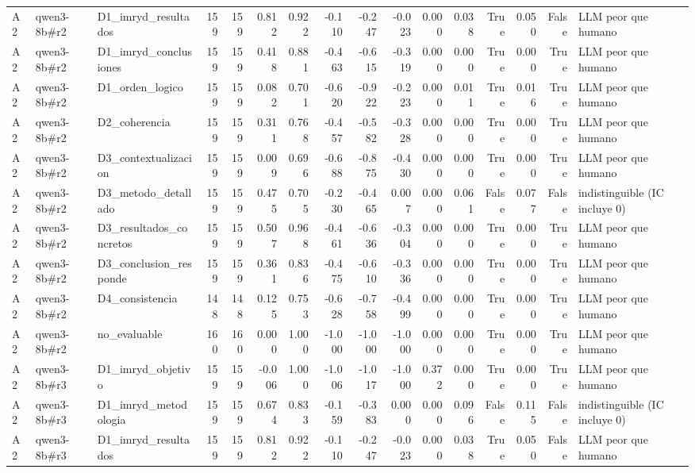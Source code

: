 \begin{table}
{\begin{tabular}{lllrrrrrrrrrrrrl}
A2 & qwen3-8b\#r2 & D1\_imryd\_resultados & 159 & 159 & 0.812 & 0.922 & -0.110 & -0.247 & -0.023 & 0.000 & 0.038 & True & 0.050 & False & LLM peor que humano \\
A2 & qwen3-8b\#r2 & D1\_imryd\_conclusiones & 159 & 159 & 0.418 & 0.881 & -0.463 & -0.615 & -0.319 & 0.000 & 0.000 & True & 0.000 & True & LLM peor que humano \\
A2 & qwen3-8b\#r2 & D1\_orden\_logico & 159 & 159 & 0.082 & 0.701 & -0.620 & -0.922 & -0.223 & 0.000 & 0.011 & True & 0.016 & True & LLM peor que humano \\
A2 & qwen3-8b\#r2 & D2\_coherencia & 159 & 159 & 0.311 & 0.768 & -0.457 & -0.582 & -0.328 & 0.000 & 0.000 & True & 0.000 & True & LLM peor que humano \\
A2 & qwen3-8b\#r2 & D3\_contextualizacion & 159 & 159 & 0.009 & 0.696 & -0.688 & -0.875 & -0.430 & 0.000 & 0.000 & True & 0.000 & True & LLM peor que humano \\
A2 & qwen3-8b\#r2 & D3\_metodo\_detallado & 159 & 159 & 0.475 & 0.705 & -0.230 & -0.465 & 0.007 & 0.000 & 0.061 & False & 0.077 & False & indistinguible (IC incluye 0) \\
A2 & qwen3-8b\#r2 & D3\_resultados\_concretos & 159 & 159 & 0.507 & 0.968 & -0.461 & -0.636 & -0.304 & 0.000 & 0.000 & True & 0.000 & True & LLM peor que humano \\
A2 & qwen3-8b\#r2 & D3\_conclusion\_responde & 159 & 159 & 0.361 & 0.836 & -0.475 & -0.610 & -0.336 & 0.000 & 0.000 & True & 0.000 & True & LLM peor que humano \\
A2 & qwen3-8b\#r2 & D4\_consistencia & 148 & 148 & 0.125 & 0.753 & -0.628 & -0.758 & -0.499 & 0.000 & 0.000 & True & 0.000 & True & LLM peor que humano \\
A2 & qwen3-8b\#r2 & no\_evaluable & 160 & 160 & 0.000 & 1.000 & -1.000 & -1.000 & -1.000 & 0.000 & 0.000 & True & 0.000 & True & LLM peor que humano \\
A2 & qwen3-8b\#r3 & D1\_imryd\_objetivo & 159 & 159 & -0.006 & 1.000 & -1.006 & -1.017 & -1.000 & 0.372 & 0.000 & True & 0.000 & True & LLM peor que humano \\
A2 & qwen3-8b\#r3 & D1\_imryd\_metodologia & 159 & 159 & 0.674 & 0.833 & -0.159 & -0.383 & 0.000 & 0.000 & 0.096 & False & 0.115 & False & indistinguible (IC incluye 0) \\
A2 & qwen3-8b\#r3 & D1\_imryd\_resultados & 159 & 159 & 0.812 & 0.922 & -0.110 & -0.247 & -0.023 & 0.000 & 0.038 & True & 0.050 & False & LLM peor que humano \\

\end{tabular}}
\end{table}
